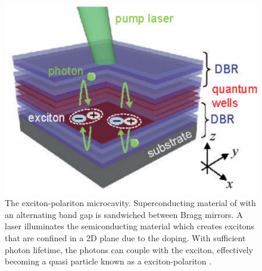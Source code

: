 \begin{figure}[htbp!]
	\centering
	\includegraphics[scale=0.4]{./Figures/polaritonsystem.pdf}
	\caption{The exciton-polariton microcavity.
	Superconducting material of with an alternating band gap is sandwiched between Bragg mirrors. 
	A laser illuminates the semiconducting material which creates excitons that are confined in a 2D plane due to the doping. 
	With sufficient photon lifetime, the photons can couple with the exciton, effectively becoming a quasi particle known as a exciton-polariton \cite{Byrnes2014}.}
	\label{fig:exciton-polariton}
\end{figure}


